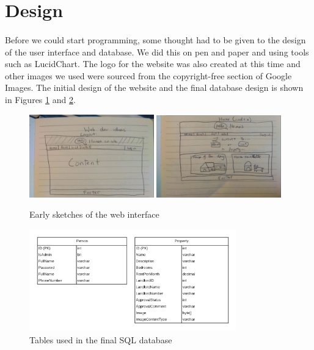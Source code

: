 \documentclass{article}
\begin{document}
\FloatBarrier
\section{Design}
    \paragraph{}
        Before we could start programming, some thought had to be given to the design of the user interface and database.
        We did this on pen and paper and using tools such as LucidChart.
        The logo for the website was also created at this time and other images we used were sourced from the copyright-free section of Google Images.
        The initial design of the website and the final database design is shown in Figures \ref{fig:early_sketches} and \ref{fig:sql_tables}.

        \begin{figure}[ht]
            \centering
            \includegraphics[width=0.48\textwidth]{figures/layout_sketch1.png}
            \includegraphics[width=0.48\textwidth]{figures/layout_sketch2.png}
            \caption[Early Sketches]{Early sketches of the web interface}
            \label{fig:early_sketches}
        \end{figure}

        \begin{figure}[ht]
            \centering
            \includegraphics[width=0.8\textwidth]{figures/sql_tables.png}
            \caption[SQL Tables]{Tables used in the final SQL database}
            \label{fig:sql_tables}
        \end{figure}
\end{document}

